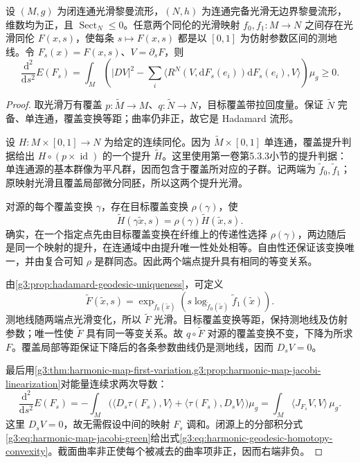 \begin{lemma}\label{g3:lem:nonpositive-target-geodesic-homotopy}
	设 \((M,g)\) 为闭连通光滑黎曼流形，\((N,h)\) 为连通完备光滑无边界黎曼流形，维数均为正，且 \(\operatorname{Sect}_N\le0\)。任意两个同伦的光滑映射 \(f_0,f_1:M\to N\) 之间存在光滑同伦 \(F(x,s)\)，使每条 \(s\mapsto F(x,s)\) 都是以 \([0,1]\) 为仿射参数区间的测地线。令 \(F_s(x)=F(x,s)\)、\(V=\partial_sF\)，则
	\begin{equation}\label{g3:eq:harmonic-geodesic-homotopy-convexity}
		\frac{\mathrm d^2}{\mathrm ds^2}E(F_s)
		=\int_M\left(|D V|^2
		-\sum_i\langle R^N(V,\mathrm dF_s(e_i))\mathrm dF_s(e_i),V\rangle\right)\mu_g
		\ge0.
	\end{equation}
\end{lemma}
\begin{proof}
	取光滑万有覆盖 \(p:\widetilde M\to M\)、\(q:\widetilde N\to N\)，目标覆盖带拉回度量。保证 \(\widetilde N\) 完备、单连通，覆盖变换等距；曲率仍非正，故它是 Hadamard 流形。

	设 \(H:M\times[0,1]\to N\) 为给定的连续同伦。因为 \(\widetilde M\times[0,1]\) 单连通，覆盖提升判据给出 \(H\circ(p\times\operatorname{id})\) 的一个提升 \(\widetilde H\)。这里使用第一卷第5.3.3小节的提升判据：单连通源的基本群像为平凡群，因而包含于覆盖所对应的子群。记两端为 \(\widetilde f_0,\widetilde f_1\)；原映射光滑且覆盖局部微分同胚，所以这两个提升光滑。

	对源的每个覆盖变换 \(\gamma\)，存在目标覆盖变换 \(\rho(\gamma)\)，使
	\[
		\widetilde H(\gamma\widetilde x,s)
		=\rho(\gamma)\widetilde H(\widetilde x,s).
	\]
	确实，在一个指定点先由目标覆盖变换在纤维上的传递性选择 \(\rho(\gamma)\)，两边随后是同一个映射的提升，在连通域中由提升唯一性处处相等。自由性还保证该变换唯一，并由复合可知 \(\rho\) 是群同态。因此两个端点提升具有相同的等变关系。

	由\cref{g3:prop:hadamard-geodesic-uniqueness}，可定义
	\[
		\widetilde F(\widetilde x,s)
		=\exp_{\widetilde f_0(\widetilde x)}
		\left(s\log_{\widetilde f_0(\widetilde x)}
		\widetilde f_1(\widetilde x)\right).
	\]
	测地线随两端点光滑变化，所以 \(\widetilde F\) 光滑。目标覆盖变换等距，保持测地线及仿射参数；唯一性使 \(\widetilde F\) 具有同一等变关系。故 \(q\circ\widetilde F\) 对源的覆盖变换不变，下降为所求 \(F\)。覆盖局部等距保证下降后的各条参数曲线仍是测地线，因而 \(D_sV=0\)。

	最后用\cref{g3:thm:harmonic-map-first-variation,g3:prop:harmonic-map-jacobi-linearization}对能量连续求两次导数：
	\[
		\frac{\mathrm d^2}{\mathrm ds^2}E(F_s)
		=-\int_M\bigl(\langle D_s\tau(F_s),V\rangle
		+\langle\tau(F_s),D_sV\rangle\bigr)\mu_g
		=\int_M\langle J_{F_s}V,V\rangle\,\mu_g.
	\]
	这里 \(D_sV=0\)，故无需假设中间的映射 \(F_s\) 调和。闭源上的分部积分式\eqref{g3:eq:harmonic-map-jacobi-green}给出式\eqref{g3:eq:harmonic-geodesic-homotopy-convexity}。截面曲率非正使每个被减去的曲率项非正，因而右端非负。
\end{proof}

